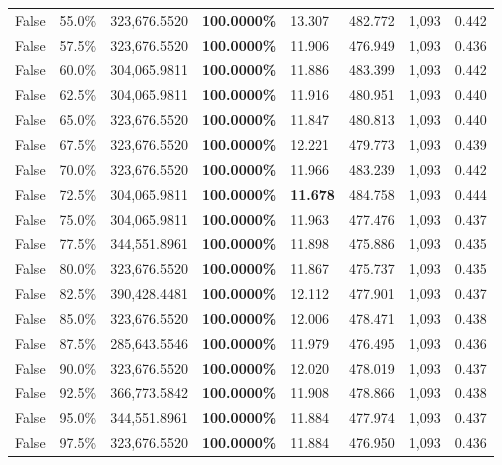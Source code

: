 \begin{table}[H]
\begin{tabular}{lllrllll}
\cline{1-8}
False & 55.0\% & 323,676.5520 & \bfseries \color{red} 100.0000\% & 13.307 & 482.772 & 1,093 & 0.442 \\
\cline{1-8}
False & 57.5\% & 323,676.5520 & \bfseries \color{red} 100.0000\% & 11.906 & 476.949 & 1,093 & 0.436 \\
\cline{1-8}
False & 60.0\% & 304,065.9811 & \bfseries \color{red} 100.0000\% & 11.886 & 483.399 & 1,093 & 0.442 \\
\cline{1-8}
False & 62.5\% & 304,065.9811 & \bfseries \color{red} 100.0000\% & 11.916 & 480.951 & 1,093 & 0.440 \\
\cline{1-8}
False & 65.0\% & 323,676.5520 & \bfseries \color{red} 100.0000\% & 11.847 & 480.813 & 1,093 & 0.440 \\
\cline{1-8}
False & 67.5\% & 323,676.5520 & \bfseries \color{red} 100.0000\% & 12.221 & 479.773 & 1,093 & 0.439 \\
\cline{1-8}
False & 70.0\% & 323,676.5520 & \bfseries \color{red} 100.0000\% & 11.966 & 483.239 & 1,093 & 0.442 \\
\cline{1-8}
False & 72.5\% & 304,065.9811 & \bfseries \color{red} 100.0000\% & \bfseries \color{red} 11.678 & 484.758 & 1,093 & 0.444 \\
\cline{1-8}
False & 75.0\% & 304,065.9811 & \bfseries \color{red} 100.0000\% & 11.963 & 477.476 & 1,093 & 0.437 \\
\cline{1-8}
False & 77.5\% & 344,551.8961 & \bfseries \color{red} 100.0000\% & 11.898 & 475.886 & 1,093 & 0.435 \\
\cline{1-8}
False & 80.0\% & 323,676.5520 & \bfseries \color{red} 100.0000\% & 11.867 & 475.737 & 1,093 & 0.435 \\
\cline{1-8}
False & 82.5\% & 390,428.4481 & \bfseries \color{red} 100.0000\% & 12.112 & 477.901 & 1,093 & 0.437 \\
\cline{1-8}
False & 85.0\% & 323,676.5520 & \bfseries \color{red} 100.0000\% & 12.006 & 478.471 & 1,093 & 0.438 \\
\cline{1-8}
False & 87.5\% & \color{red} 285,643.5546 & \bfseries \color{red} 100.0000\% & 11.979 & 476.495 & 1,093 & 0.436 \\
\cline{1-8}
False & 90.0\% & 323,676.5520 & \bfseries \color{red} 100.0000\% & 12.020 & 478.019 & 1,093 & 0.437 \\
\cline{1-8}
False & 92.5\% & 366,773.5842 & \bfseries \color{red} 100.0000\% & 11.908 & 478.866 & 1,093 & 0.438 \\
\cline{1-8}
False & 95.0\% & 344,551.8961 & \bfseries \color{red} 100.0000\% & 11.884 & 477.974 & 1,093 & 0.437 \\
\cline{1-8}
False & 97.5\% & 323,676.5520 & \bfseries \color{red} 100.0000\% & 11.884 & 476.950 & 1,093 & 0.436 \\
\cline{1-8}
\bottomrule
\end{tabular}
\end{table}
